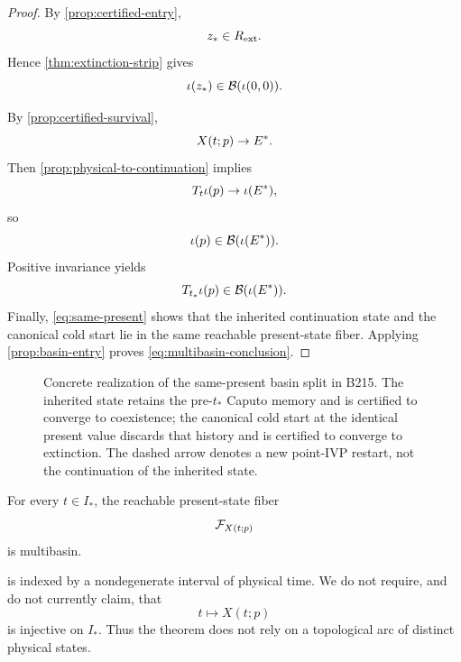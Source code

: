 \begin{proof}
By \cref{prop:certified-entry},
\[
  z_*\in R_{\mathrm{ext}}.
\]
Hence \cref{thm:extinction-strip} gives
\[
  \iota(z_*)\in\mathcal{B}(\iota(0,0)).
\]

By \cref{prop:certified-survival},
\[
  X(t;p)\to E^{*}.
\]
Then \cref{prop:physical-to-continuation} implies
\[
  T_t\iota(p)\to\iota(E^{*}),
\]
so
\[
  \iota(p)\in\mathcal{B}(\iota(E^{*})).
\]
Positive invariance yields
\[
  T_{t_*}\iota(p)\in\mathcal{B}(\iota(E^{*})).
\]
Finally, \eqref{eq:same-present} shows that the inherited continuation state and the canonical cold start lie in the same reachable present-state fiber. Applying \cref{prop:basin-entry} proves \eqref{eq:multibasin-conclusion}.
\end{proof}

\begin{figure}[t]
  \centering
  \resizebox{\textwidth}{!}{}
  \caption{Concrete realization of the same-present basin split in B215.  The inherited state retains the pre-\(t_*\) Caputo memory and is certified to converge to coexistence; the canonical cold start at the identical present value discards that history and is certified to converge to extinction.  The dashed arrow denotes a new point-IVP restart, not the continuation of the inherited state.}
  \label{fig:same-present-split}
\end{figure}

\begin{corollary}
\label{cor:principal-interval}
For every \(t\in I_*\), the reachable present-state fiber
\[
  \mathcal{F}_{X(t;p)}
\]
is multibasin.
\end{corollary}

\begin{remark}
\label{rem:scope-principal}
 is indexed by a nondegenerate interval of physical time. We do not require, and do not currently claim, that
\[
  t\mapsto X(t;p)
\]
is injective on \(I_*\). Thus the theorem does not rely on a topological arc of distinct physical states.
\end{remark}
